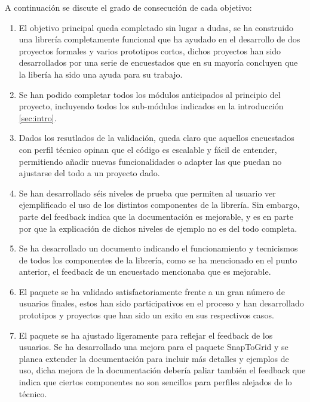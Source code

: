 A continuación se discute el grado de consecución de cada objetivo:
\begin{enumerate}[itemsep=0mm]

\item El objetivo principal queda completado sin lugar a dudas, se ha construido una librería completamente funcional que ha ayudado en el desarrollo de dos proyectos formales y varios prototipos cortos, dichos 
proyectos han sido desarrollados por una serie de encuestados que en su mayoría concluyen que la libería ha sido una ayuda para su trabajo.
  
\item Se han podido completar todos los módulos anticipados al principio del proyecto, incluyendo todos los sub-módulos indicados en la introducción \ref{sec:intro}.

\item Dados los resutlados de la validación, queda claro que aquellos encuestados con perfil técnico opinan que el código es escalable y fácil de entender, permitiendo añadir nuevas funcionalidades o adapter 
las que puedan no ajustarse del todo a un proyecto dado.

\item Se han desarrollado séis niveles de prueba que permiten al usuario ver ejemplificado el uso de los distintos componentes de la librería. Sin embargo, parte del feedback indica que la documentación es 
mejorable, y es en parte por que la explicación de dichos niveles de ejemplo no es del todo completa.

\item Se ha desarrollado un documento indicando el funcionamiento y tecnicismos de todos los componentes de la librería, como se ha mencionado en el punto anterior, el feedback de un encuestado mencionaba que
 es mejorable.
 
\item El paquete se ha validado satisfactoriamente frente a un gran número de usuarios finales, estos han sido participativos en el proceso y han desarrollado prototipos y proyectos que han sido un exito en 
sus respectivos casos.

\item El paquete se ha ajustado ligeramente para reflejar el feedback de los usuarios. Se ha desarrollado una mejora para el paquete SnapToGrid y se planea extender la documentación para incluir más detalles 
y ejemplos de uso, dicha mejora de la documentación debería paliar también el feedback que indica que ciertos componentes no son sencillos para perfiles alejados de lo técnico.

\end{enumerate}

